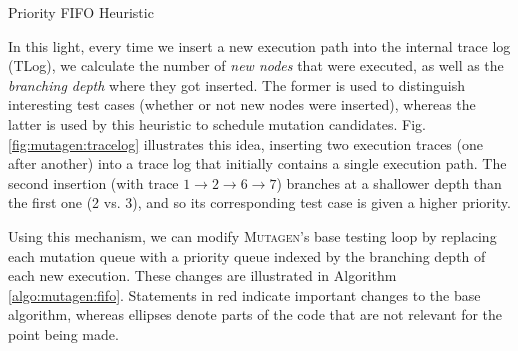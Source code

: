 \documentclass[sigconf, anonymous, review]{acmart}
\newcommand{\mutagen}{\textsc{Mutagen}\xspace}
\begin{document}
\begin{algorithm}[t]
  \SetAlgoLined
  \DontPrintSemicolon

\caption{\label{algo:mutagen:fifo}Priority FIFO Heuristic}
\end{algorithm}


In this light, every time we insert a new execution path into the internal trace
log (TLog), we calculate the number of \emph{new nodes} that were executed, as
well as the \emph{branching depth} where they got inserted.
%
The former is used to distinguish interesting test cases (whether or not new
nodes were inserted), whereas the latter is used by this heuristic to schedule
mutation candidates.
%
Fig. \ref{fig:mutagen:tracelog} illustrates this idea, inserting two execution
traces (one after another) into a trace log that initially contains a single
execution path.
%
The second insertion (with trace $1 \rightarrow 2 \rightarrow 6 \rightarrow 7$)
branches at a shallower depth than the first one (2 vs. 3), and so its
corresponding test case is given a higher priority.


Using this mechanism, we can modify \mutagen's base testing loop by replacing
each mutation queue with a priority queue indexed by the branching depth of each
new execution.
%
These changes are illustrated in Algorithm \ref{algo:mutagen:fifo}.
%
Statements in {\color{red} red} indicate important changes to the base
algorithm, whereas ellipses denote parts of the code that are not relevant for
the point being made.
\end{document}
